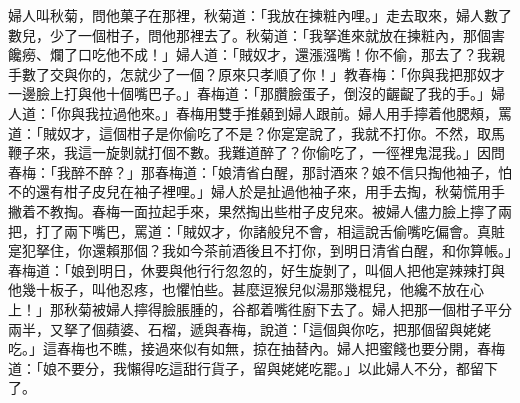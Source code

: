 婦人叫秋菊，問他菓子在那裡，秋菊道：「我放在揀粧內哩。」走去取來，婦人數了數兒，少了一個柑子，{}問他那裡去了。秋菊道：「我拏進來就放在揀粧內，那個害饞癆、爛了口吃他不成！」婦人道：「賊奴才，還漲漒嘴！你不偷，那去了？我親手數了交與你的，怎就少了一個？原來只孝順了你！」教春梅：「你與我把那奴才一邊臉上打與他十個嘴巴子。」春梅道：「那臢臉蛋子，倒沒的齷齪了我的手。」婦人道：「你與我拉過他來。」春梅用雙手推顙到婦人跟前。婦人用手擰着他腮頰，罵道：「賊奴才，這個柑子是你偷吃了不是？你寔寔說了，我就不打你。不然，取馬鞭子來，我這一旋剝就打個不數。我難道醉了？你偷吃了，一徑裡鬼混我。」因問春梅：「我醉不醉？」{}那春梅道：「娘清省白醒，那討酒來？{}娘不信只掏他袖子，怕不的還有柑子皮兒在袖子裡哩。」婦人於是扯過他袖子來，用手去掏，秋菊慌用手撇着不教掏。春梅一面拉起手來，果然掏出些柑子皮兒來。{}被婦人儘力臉上擰了兩把，打了兩下嘴巴，罵道：「賊奴才，你諸般兒不會，相這說舌偷嘴吃偏會。真賍寔犯拏住，你還賴那個？我如今茶前酒後且不打你，{}到明日清省白醒，和你算帳。」春梅道：「娘到明日，休要與他行行忽忽的，好生旋剝了，叫個人把他寔辣辣打與他幾十板子，叫他忍疼，也懼怕些。甚麼逗猴兒似湯那幾棍兒，他纔不放在心上！」那秋菊被婦人擰得臉脹腫的，谷都着嘴徃廚下去了。婦人把那一個柑子平分兩半，又拏了個蘋婆、石榴，遞與春梅，說道：「這個與你吃，把那個留與姥姥吃。」這春梅也不瞧，接過來似有如無，掠在抽替內。婦人把蜜餞也要分開，春梅道：「娘不要分，我懶得吃這甜行貨子，留與姥姥吃罷。」以此婦人不分，都留下了。

